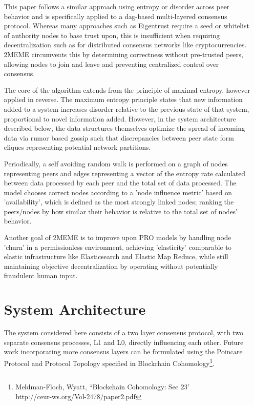 \documentclass{article}
\begin{document}
This paper follows a similar approach using entropy or disorder across peer behavior and is specifically applied to a dag-based multi-layered consensus protocol. Whereas many approaches such as Eigentrust require a seed or whitelist of authority nodes to base trust upon, this is insufficient when requiring decentralization such as for distributed consensus networks like cryptocurrencies. 2MEME circumvents this by determining correctness without pre-trusted peers, allowing nodes to join and leave and preventing centralized control over consensus.

The core of the algorithm extends from the principle of maximal entropy, however applied in reverse. The maximum entropy principle states that new information added to a system increases disorder relative to the previous state of that system, proportional to novel information added. However, in the system architecture described below, the data structures themselves optimize the spread of incoming data via rumor based gossip such that discrepancies between peer state form cliques representing potential network partitions.

Periodically, a self avoiding random walk is performed on a graph of nodes representing peers and edges representing a vector of the entropy rate calculated between data processed by each peer and the total set of data processed. The model chooses correct nodes according to a 'node influence metric' based on 'availability', which is defined as the most strongly linked nodes; ranking the peers/nodes by how similar their behavior is relative to the total set of nodes' behavior.

Another goal of 2MEME is to improve upon PRO models by handling node 'churn' in a permissionless environment, achieving 'elasticity' comparable to elastic infrastructure like Elasticsearch and Elastic Map Reduce, while still maintaining objective decentralization by operating without potentially fraudulent human input.

\section{System Architecture}
The system considered here consists of a two layer consensus protocol, with two separate consensus processes, L1 and L0, directly influencing each other. Future work incorporating more consensus layers can be formulated using the Poincare Protocol and Protocol Topology specified in Blockchain Cohomology\footnote{Meldman-Floch, Wyatt, ``Blockchain Cohomology: Sec 23' \\ http://ceur-ws.org/Vol-2478/paper2.pdf}.
\end{document}
